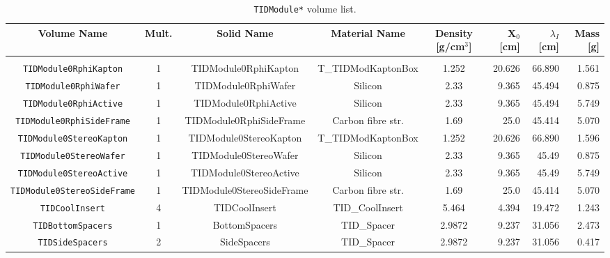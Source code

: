 \documentclass{cmspaper}
\begin{document}
\begin{table}
  \caption{{\tt TIDModule*} volume list.}
  \label{tab:tid_module}
  \begin{center}
    \begin{tabular}{cccccrrr}
         Volume Name                   & Mult. & Solid Name                    & Material Name         & Density [g/cm$^3$]     & X$_0$ [cm] & $\lambda_I$ [cm]  & Mass [g]   \\ 
	 \hline \\
         {\tt TIDModule0RphiKapton}         & 1     & TIDModule0RphiKapton          & T\_TIDModKaptonBox    & 1.252          &  20.626 & 66.890 & 1.561 \\
         {\tt TIDModule0RphiWafer}          & 1     & TIDModule0RphiWafer           & Silicon               & 2.33           &  9.365 & 45.494  & 0.875 \\
         {\tt TIDModule0RphiActive}         & 1     & TIDModule0RphiActive          & Silicon               & 2.33           &  9.365 & 45.494  & 5.749 \\
         {\tt TIDModule0RphiSideFrame}      & 1     & TIDModule0RphiSideFrame       & Carbon fibre str.     & 1.69           &  25.0  & 45.414  & 5.070 \\
         {\tt TIDModule0StereoKapton}       & 1     & TIDModule0StereoKapton        & T\_TIDModKaptonBox    & 1.252          &  20.626 & 66.890 & 1.596 \\ 
         {\tt TIDModule0StereoWafer}        & 1     & TIDModule0StereoWafer         & Silicon               & 2.33           &  9.365 & 45.49   & 0.875 \\
         {\tt TIDModule0StereoActive}       & 1     & TIDModule0StereoActive        & Silicon               & 2.33           &  9.365 & 45.49   & 5.749 \\
         {\tt TIDModule0StereoSideFrame}    & 1     & TIDModule0StereoSideFrame     & Carbon fibre str.     & 1.69           &  25.0  & 45.414  & 5.070 \\
         {\tt TIDCoolInsert}                & 4     & TIDCoolInsert                 & TID\_CoolInsert       & 5.464          &  4.394 & 19.472  & 1.243 \\
         {\tt TIDBottomSpacers}             & 1     & BottomSpacers                 & TID\_Spacer           & 2.9872         &  9.237 & 31.056  & 2.473 \\
         {\tt TIDSideSpacers}               & 2     & SideSpacers                   & TID\_Spacer           & 2.9872         &  9.237 & 31.056  & 0.417 \\

\end{tabular}
\end{center}
\end{table}
\end{document}
